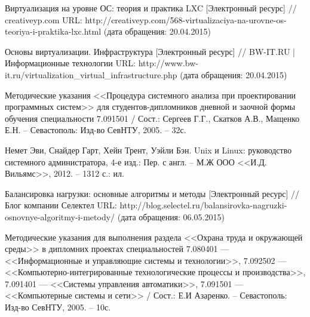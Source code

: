 \begin{thebibliography}{00}
    Виртуализация на уровне ОС: теория и практика LXC
    [Электронный ресурс] //
    creativeyp.com
    URL: http://creativeyp.com/568-virtualizaciya-na-urovne-os-teoriya-i-praktika-lxc.html
    (дата обращения: 20.04.2015)

    Основы виртуализации. Инфраструктура
    [Электронный ресурс] //
    BW-IT.RU | Информационные технологии
    URL: http://www.bw-it.ru/virtualization\_virtual\_infrastructure.php
    (дата обращения: 20.04.2015)

    Методические указания <<Процедура системного анализа при проектировании программных систем>>
    для студентов-дипломников дневной и заочной формы обучения специальности 7.091501 /
    Сост.: Сергеев Г.Г., Скатков А.В., Мащенко Е.Н. -- Севастополь:
    Изд-во СевНТУ, 2005. -- 32с.

    Немет Эви, Снайдер Гарт, Хейн Трент, Уэйли Бэн.
    Unix и Linux: руководство системного администратора,
    4-е изд.: Пер. с англ. -- М.Ж ООО <<И.Д. Вильямс>>, 2012. --
    1312 с.: ил.

    Балансировка нагрузки: основные алгоритмы и методы
    [Электронный ресурс] //
    Блог компании Селектел
    URL: http://blog.selectel.ru/balansirovka-nagruzki-osnovnye-algoritmy-i-metody/
    (дата обращения: 06.05.2015)

    Методические указания для выполнения раздела <<Охрана труда и окружающей среды>>
    в дипломних проектах специальностей
    7.080401 --- <<Информационные и управляющие системы и технологии>>,
    7.092502 --- <<Компьютерно-интегрированные технологические процессы и производства>>,
    7.091401 --- <<Системы управления автоматики>>,
    7.091501 --- <<Компьютерные системы и сети>> / Сост.: Е.И Азаренко. -- Севастополь:
    Изд-во СевНТУ, 2005. -- 10с.

\end{thebibliography}
\endgroup

\clearpage
